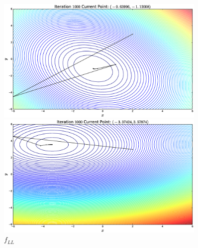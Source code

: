 \documentclass{article}
\begin{document}
\begin{flushleft}
\begin{figure}[H]
\begin{minipage}{0.45\linewidth}
\includegraphics[width=0.9\textwidth]{./images/quad_inv}
\caption{\(f_{Q}\)}
\end{minipage}
\hfill
\begin{minipage}{0.45\linewidth}
\includegraphics[width=0.9\textwidth]{./images/log_reg_inv}
\caption{\(f_{LL}\)}
\end{minipage}
\end{figure}


\end{flushleft}
\end{document}
